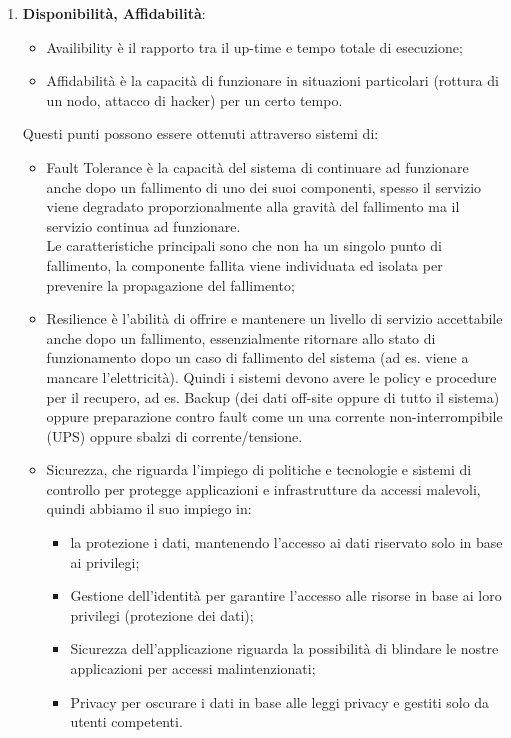 \documentclass[11pt, twocolumn]{article}
\begin{document}
\begin{enumerate}[noitemsep, topsep=0ex, leftmargin=*]
	\item \textbf{Disponibilità, Affidabilità}:
	\begin{itemize}[noitemsep, topsep=0ex, leftmargin=*]
		\item Availibility è il rapporto tra il up-time e tempo totale di esecuzione;
		\item Affidabilità è la capacità di funzionare in situazioni particolari (rottura di un nodo, attacco di hacker) per un certo tempo.
	\end{itemize}
	Questi punti possono essere ottenuti attraverso sistemi di:
	\begin{itemize}[noitemsep, topsep=0ex, leftmargin=*]
		\item Fault Tolerance è la capacità del sistema di continuare ad funzionare anche dopo un fallimento di uno dei suoi componenti, spesso il servizio viene degradato proporzionalmente alla gravità del fallimento ma il servizio continua ad funzionare.\\
		Le caratteristiche principali sono che non ha un singolo punto di fallimento, la componente fallita viene individuata ed isolata per prevenire la propagazione del fallimento;
		\item Resilience è l'abilità di offrire e mantenere un livello di servizio accettabile anche dopo un fallimento, essenzialmente ritornare allo stato di funzionamento dopo un caso di fallimento del sistema (ad es. viene a mancare l'elettricità).
		Quindi i sistemi devono avere le policy e procedure per il recupero, ad es. Backup (dei dati off-site oppure di tutto il sistema) oppure preparazione contro fault come un una corrente non-interrompibile (UPS) oppure sbalzi di corrente/tensione.
		\item Sicurezza, che riguarda l'impiego di politiche e tecnologie e sistemi di controllo per protegge applicazioni e infrastrutture da accessi malevoli, quindi abbiamo il suo impiego in:
		\begin{itemize}[noitemsep, topsep=0ex, leftmargin=*]
			\item la protezione i dati, mantenendo l'accesso ai dati riservato solo in base ai privilegi;
			\item Gestione dell'identità per garantire l'accesso alle risorse in base ai loro privilegi (protezione dei dati);
			\item Sicurezza dell'applicazione riguarda la possibilità di blindare le nostre applicazioni per accessi malintenzionati;
			\item Privacy per oscurare i dati in base alle leggi privacy e gestiti solo da utenti competenti.
		\end{itemize}
	\end{itemize}


\end{enumerate}
\end{document}
